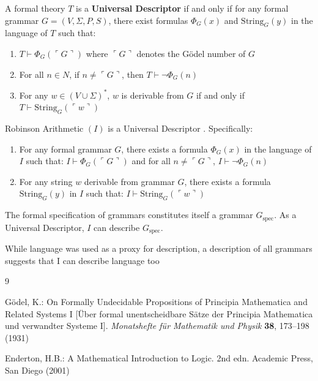 \documentclass[runningheads]{llncs}
\begin{document}
	\medskip
	
	\begin{definition}
		A formal theory $T$ is a \textbf{Universal Descriptor} if and only if for any formal grammar $G = (V, \Sigma, P, S)$, there exist formulas $\Phi_G(x)$ and $\text{String}_G(y)$ in the language of $T$ such that:
		\begin{enumerate}
			\item $T \vdash \Phi_G(\ulcorner G \urcorner)$ where $\ulcorner G \urcorner$ denotes the Gödel number of $G$
			\item For all $n \in N$, if $n \neq \ulcorner G \urcorner$, then $T \vdash \neg\Phi_G(n)$
			\item For any $w \in (V \cup \Sigma)^*$, $w$ is derivable from $G$ if and only if $T \vdash \text{String}_G(\ulcorner w \urcorner)$
		\end{enumerate}
	\end{definition}
	
	\medskip
	
	\begin{theorem}
		Robinson Arithmetic $(I)$ is a Universal Descriptor \cite{Godel1931}\cite{Enderton2001}. Specifically:
		\begin{enumerate}
			\item For any formal grammar $G$, there exists a formula $\Phi_G(x)$ in the language of $I$ such that:
			$I \vdash \Phi_G(\ulcorner G \urcorner)$ and for all $n \neq \ulcorner G \urcorner$, $I \vdash \neg\Phi_G(n)$
			\item For any string $w$ derivable from grammar $G$, there exists a formula $\text{String}_G(y)$ in $I$ such that:
			$I \vdash \text{String}_G(\ulcorner w \urcorner)$
		\end{enumerate}
	\end{theorem}
	
	\medskip
	
	\begin{corollary}
		The formal specification of grammars constitutes itself a grammar $G_{\text{spec}}$. As a Universal Descriptor, $I$ can describe $G_{\text{spec}}$.
	\end{corollary}

    \medskip

    While language was used as a proxy for description, a description of all grammars suggests that I can describe language too
	
	\begin{thebibliography}{9}
		
		Gödel, K.: On Formally Undecidable Propositions of Principia Mathematica and Related Systems I [Über formal unentscheidbare Sätze der Principia Mathematica und verwandter Systeme I]. \textit{Monatshefte für Mathematik und Physik} \textbf{38}, 173--198 (1931)
		
        Enderton, H.B.: A Mathematical Introduction to Logic. 2nd edn. Academic Press, San Diego (2001)
		
	\end{thebibliography}
	
\end{document}
